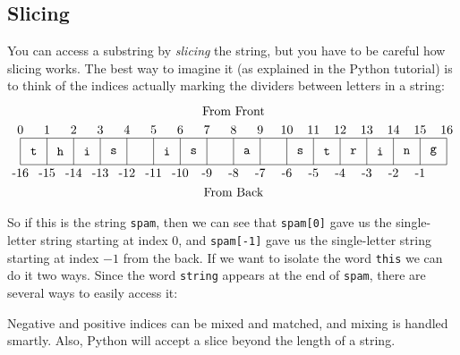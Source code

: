 \documentclass[m3380-lec-main.tex]{subfiles}
\begin{document}
\subsection{Slicing} You can access a substring by \emph{slicing} the string, but you have to be careful how slicing works. The best way to imagine it (as explained in the Python tutorial) is to think of the indices actually marking the dividers between letters in a string:
\[\begin{tikzpicture}[scale=.75]
\draw 
	(0,0) node [below] {-16} -- (16,0) 
	(16,1) node [above] {16} -- (0,1) node [above] {0};
\foreach \x in {0,1,...,16}{\draw (\x,0) -- (\x,1);}
\path
	(0.5,.5) node {\texttt{t}}
	(1.5,.5) node {\texttt{h}}
	(2.5,.5) node {\texttt{i}}
	(3.5,.5) node {\texttt{s}}
	(5.5,.5) node {\texttt{i}}
	(6.5,.5) node {\texttt{s}}
	(8.5,.5) node {\texttt{a}}
	(10.5,.5) node {\texttt{s}}
	(11.5,.5) node {\texttt{t}}
	(12.5,.5) node {\texttt{r}}
	(13.5,.5) node {\texttt{i}}
	(14.5,.5) node {\texttt{n}}
	(15.5,.5) node {\texttt{g}}
	(8,1.7) node [above] {From Front}
	(8,-.7) node [below] {From Back};
\foreach \x in {1,2,...,15}{
	\node [above] at (\x,1) {\x};
	\node [below] at (16-\x,0) {-\x};
}
\end{tikzpicture}\]

So if this is the string \verb|spam|, then we can see that \verb|spam[0]| gave us the single-letter string starting at index 0, and \verb|spam[-1]| gave us the single-letter string starting at index $-1$ from the back. If we want to isolate the word \verb|this| we can do it two ways. Since the word \verb|string| appears at the end of \verb|spam|, there are several ways to easily access it: 

\smallskip\noindent
Negative and positive indices can be mixed and matched, and mixing is handled smartly. Also, Python will accept a slice beyond the length of a string.
\end{document}
